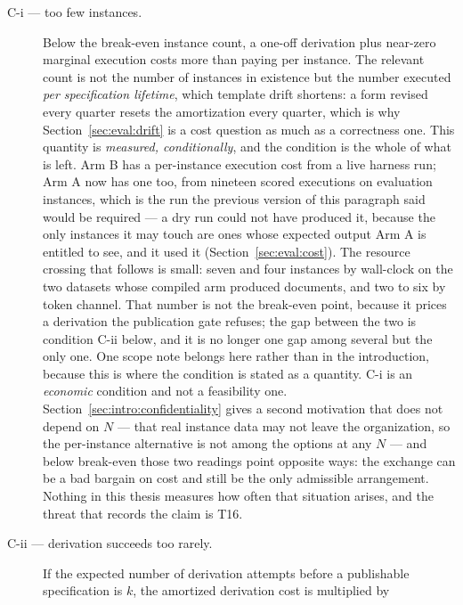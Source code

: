 \begin{description}
  \item[C-i --- too few instances.] Below the break-even instance count, a one-off derivation
    plus near-zero marginal execution costs more than paying per instance. The relevant count is
    not the number of instances in existence but the number executed \emph{per specification
    lifetime}, which template drift shortens: a form revised every quarter resets the
    amortization every quarter, which is why Section~\ref{sec:eval:drift} is a cost question as
    much as a correctness one. This quantity is \emph{measured, conditionally}, and the condition
    is the whole of what is left. Arm B has a per-instance execution cost from a live harness
    run; Arm A now has one too, from nineteen scored executions on evaluation instances, which
    is the run the previous version of this paragraph said would be required --- a dry run could
    not have produced it, because the only instances it may touch are ones whose expected output
    Arm A is entitled to see, and it used it (Section~\ref{sec:eval:cost}). The resource
    crossing that follows is small: seven and four instances by wall-clock on the two datasets
    whose compiled arm produced documents, and two to six by token channel. That number is not
    the break-even point, because it prices a derivation the publication gate refuses; the gap
    between the two is condition C-ii below, and it is no longer one gap among several but the
    only one.
    One scope note belongs here rather than in the introduction, because this is where the
    condition is stated as a quantity. C-i is an \emph{economic} condition and not a
    feasibility one. Section~\ref{sec:intro:confidentiality} gives a second motivation that
    does not depend on $N$ --- that real instance data may not leave the organization, so the
    per-instance alternative is not among the options at any $N$ --- and below break-even those
    two readings point opposite ways: the exchange can be a bad bargain on cost and still be
    the only admissible arrangement. Nothing in this thesis measures how often that situation
    arises, and the threat that records the claim is T16.
  \item[C-ii --- derivation succeeds too rarely.] If the expected number of derivation attempts
    before a publishable specification is $k$, the amortized derivation cost is multiplied by

\end{description}
